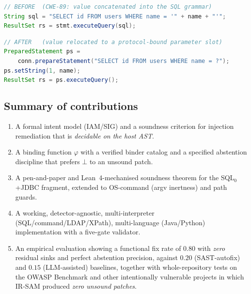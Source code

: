 \documentclass[11pt,a4paper]{article}
\newcommand{\bottom}{\ensuremath{\bot}}
\newcommand{\irsam}{\mbox{IR\nobreakdash-SAM}}
\begin{document}
\begin{lstlisting}[language=Java,aboveskip=4pt,belowskip=2pt]
// BEFORE  (CWE-89: value concatenated into the SQL grammar)
String sql = "SELECT id FROM users WHERE name = '" + name + "'";
ResultSet rs = stmt.executeQuery(sql);
\end{lstlisting}
\begin{lstlisting}[language=Java,aboveskip=2pt,belowskip=4pt]
// AFTER   (value relocated to a protocol-bound parameter slot)
PreparedStatement ps =
    conn.prepareStatement("SELECT id FROM users WHERE name = ?");
ps.setString(1, name);
ResultSet rs = ps.executeQuery();
\end{lstlisting}

\subsection{Summary of contributions}
\begin{enumerate}[label=\textbf{C\arabic*.},leftmargin=2.6em]
  \item A formal intent model (IAM/SIG) and a soundness criterion for
  injection remediation that is \emph{decidable on the host AST}.
  \item A binding function $\varphi$ with a verified binder catalog and a
  specified abstention discipline that prefers \bottom{} to an unsound
  patch.
  \item A pen-and-paper and Lean~4-mechanised soundness theorem for the
  SQL$_0$+JDBC fragment, extended to OS-command (argv inertness) and path
  guards.
  \item A working, detector-agnostic, multi-interpreter
  (SQL/command/LDAP/XPath), multi-language (Java/Python) implementation
  with a five-gate validator.
  \item An empirical evaluation showing a functional fix rate of $0.80$
  with \emph{zero} residual sinks and perfect abstention precision,
  against $0.20$ (SAST-autofix) and $0.15$ (LLM-assisted) baselines,
  together with whole-repository tests on the OWASP Benchmark and other
  intentionally vulnerable projects in which \irsam{} produced
  \emph{zero unsound patches}.
\end{enumerate}
\end{document}
